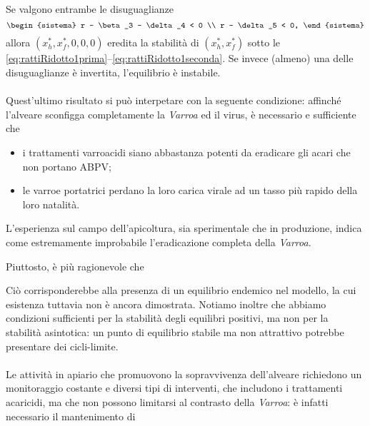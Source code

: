 Se valgono entrambe le disuguaglianze
$$
\begin{sistema}
    r - \beta_3 - \delta_4 < 0 \\
    r - \delta_5 < 0,
\end{sistema}
$$
allora $(x_h^*, x_f^*, 0,0,0)$ eredita la stabilità di $(x_h^*, x_f^*)$ sotto le \eqref{eq:rattiRidotto1prima}--\eqref{eq:rattiRidotto1seconda}.
Se invece (almeno) una delle disuguaglianze è invertita, l'equilibrio è instabile.

\paragraph{}
Quest'ultimo risultato si può interpetare con la seguente condizione: affinché l'alveare sconfigga completamente la \emph{Varroa} ed il virus, è necessario e sufficiente che
\begin{itemize}
    \item i trattamenti varroacidi siano abbastanza potenti da eradicare gli acari che non portano ABPV;
    \item le varroe portatrici perdano la loro carica virale ad un tasso più rapido della loro natalità.
\end{itemize}

L'esperienza sul campo dell'apicoltura, sia sperimentale che in produzione, indica come estremamente improbabile l'eradicazione completa della \emph{Varroa}.~\cite{privFPan}

Piuttosto, è più ragionevole che 

Ciò corrisponderebbe alla presenza di un equilibrio endemico nel modello, la cui esistenza tuttavia non è ancora dimostrata.
Notiamo inoltre che abbiamo condizioni sufficienti per la stabilità degli equilibri positivi, ma non per la stabilità asintotica: un punto di equilibrio stabile ma non attrattivo potrebbe presentare dei cicli-limite.


\paragraph{}
Le attività in apiario che promuovono la sopravvivenza dell'alveare richiedono un monitoraggio costante e diversi tipi di interventi, che includono i trattamenti acaricidi, ma che non possono limitarsi al contrasto della \emph{Varroa}: è infatti necessario il mantenimento di 


